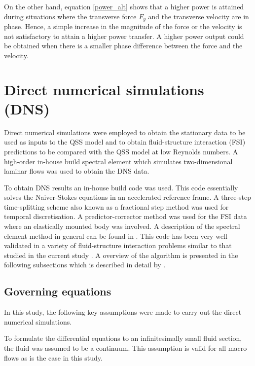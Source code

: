 On the other hand, equation \ref{power_alt} shows that a higher power is attained during situations where the transverse force $F_{y}$ and the transverse velocity are in phase. Hence, a simple increase in the magnitude of the force or the velocity is not satisfactory to attain a higher power transfer. A higher power output could be obtained when there is a smaller phase difference between the force and the velocity.   



\section{Direct numerical simulations (DNS)}

Direct numerical simulations were employed to obtain the stationary data to be used as inputs to the QSS model and to obtain  fluid-structure interaction (FSI) predictions to be compared with the QSS model at low Reynolds numbers. A high-order in-house build spectral element which simulates two-dimensional laminar flows was used to obtain the DNS data.


To obtain DNS results an in-house build code was used. This code essentially solves the Naiver-Stokes equations in an accelerated reference frame. A three-step time-splitting scheme also known as a fractional step method was used for temporal discretisation. A predictor-corrector method was used for the FSI data where an elastically mounted body was involved. A description of the spectral element method in general can be found in \citet{karniadakis2005}. This code has been very well validated in a variety of fluid-structure interaction problems similar to that studied in the current study \citep{Leontini2007a,Griffith2011,Leontini2011,Leontini2013}. A overview of the algorithm is presented in the following subsections which is described in detail by \citet{Leontini:thesis}. 

\subsection{Governing equations}
 
  In this study, the following key assumptions were made to carry out the direct numerical simulations. 
 
 To formulate the differential equations to an infinitesimally small fluid section, the fluid was assumed to be a continuum. This assumption is valid for all macro flows as  is the case in this study. 
 
